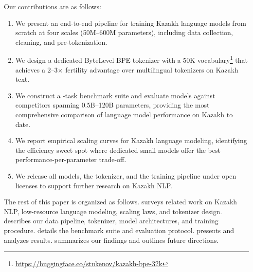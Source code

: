 Our contributions are as follows:
\begin{enumerate}
  \item We present an end-to-end pipeline for training Kazakh language
    models from scratch at four scales (50M--600M parameters), including
    data collection, cleaning, and pre-tokenization.
  \item We design a dedicated ByteLevel BPE tokenizer with a 50K
    vocabulary\footnote{\url{https://huggingface.co/stukenov/kazakh-bpe-32k}}
    that achieves a 2--3$\times$ fertility advantage over
    multilingual tokenizers on Kazakh text.
  \item We construct a \numTasks{}-task benchmark suite and evaluate
    \sozkz{} models against \numModels{} competitors spanning
    0.5B--120B parameters, providing the most comprehensive comparison
    of language model performance on Kazakh to date.
  \item We report empirical scaling curves for Kazakh language modeling,
    identifying the efficiency sweet spot where dedicated small models
    offer the best performance-per-parameter trade-off.
  \item We release all models, the tokenizer, and the training pipeline
    under open licenses to support further research on Kazakh NLP.
\end{enumerate}

The rest of this paper is organized as follows.
 surveys related work on Kazakh NLP, low-resource
language modeling, scaling laws, and tokenizer design.
 describes our data pipeline, tokenizer,
model architectures, and training procedure.
 details the benchmark suite and evaluation
protocol.   presents and analyzes results.
 summarizes our findings and outlines future
directions.
